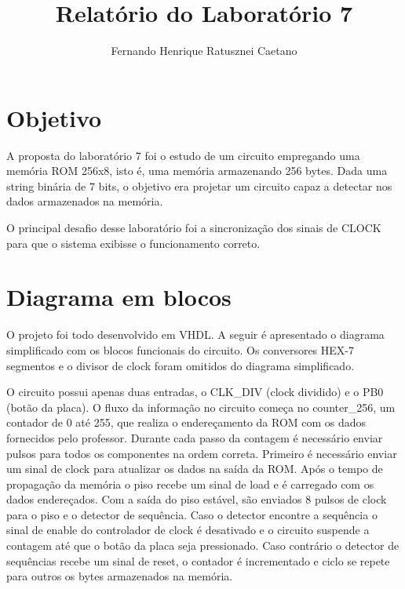 \documentclass[12pt, a4paper]{article}
\author{Fernando Henrique Ratusznei Caetano}
\title{Relatório do Laboratório 7}
\begin{document}
\maketitle
\tableofcontents

\section{Objetivo}
\par A proposta do laboratório 7 foi o estudo de um circuito empregando uma memória ROM 256x8,
isto é, uma memória armazenando 256 bytes.
Dada uma string binária de 7 bits, o objetivo era projetar um circuito capaz
a detectar nos dados armazenados na memória.

\par O principal desafio desse laboratório foi a sincronização dos sinais de CLOCK para que
o sistema exibisse o funcionamento correto.

\newpage
\section{Diagrama em blocos}

\par O projeto foi todo desenvolvido em VHDL. 
A seguir é apresentado o diagrama simplificado com os blocos funcionais do circuito.
Os conversores HEX-7 segmentos e o divisor de clock foram omitidos do diagrama simplificado.



\par O circuito possui apenas duas entradas, o CLK\_DIV (clock dividido) e o PB0 (botão da placa).
O fluxo da informação no circuito começa no counter\_256, um contador de 0 até 255, que realiza
o endereçamento da ROM com os dados fornecidos pelo professor. 
Durante cada passo da contagem é necessário enviar pulsos para todos os componentes na ordem correta.
Primeiro é necessário enviar um sinal de clock para atualizar os dados na saída da ROM.
Após o tempo de propagação da memória o piso recebe um sinal de load e é carregado com os dados endereçados. 
Com a saída do piso estável, são enviados 8 pulsos de clock para o piso e o detector de sequência. 
Caso o detector encontre a sequência o sinal de enable do controlador de clock é desativado e
o circuito suspende a contagem até que o botão da placa seja pressionado. 
Caso contrário o detector de sequências recebe um sinal de reset, o contador é incrementado
e ciclo se repete para outros os bytes armazenados na memória.
\end{document}
